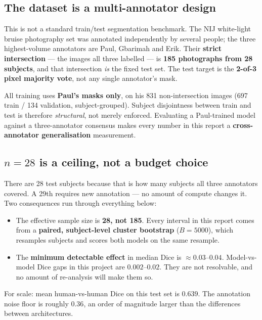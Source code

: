 \documentclass[11pt]{article}
\begin{document}
\subsection{The dataset is a multi-annotator design}

This is not a standard train/test segmentation benchmark. The NIJ white-light bruise photography
set was annotated independently by several people; the three highest-volume annotators are Paul,
Gbarimah and Erik. Their \textbf{strict intersection} --- the images all three labelled --- is
\textbf{185 photographs from 28 subjects}, and that intersection \emph{is} the fixed test set. The
test target is the \textbf{2-of-3 pixel majority vote}, not any single annotator's mask.

All training uses \textbf{Paul's masks only}, on his 831 non-intersection images (697 train / 134
validation, subject-grouped). Subject disjointness between train and test is therefore
\emph{structural}, not merely enforced. Evaluating a Paul-trained model against a three-annotator
consensus makes every number in this report a \textbf{cross-annotator generalisation} measurement.

\subsection{$n=28$ is a ceiling, not a budget choice}

There are 28 test subjects because that is how many subjects all three annotators covered. A 29th
requires new annotation --- no amount of compute changes it. Two consequences run through
everything below:

\begin{itemize}[leftmargin=1.5em,itemsep=2pt]
  \item The effective sample size is \textbf{28, not 185}. Every interval in this report comes
        from a \textbf{paired, subject-level cluster bootstrap} ($B=5000$), which resamples
        subjects and scores both models on the same resample.
  \item The \textbf{minimum detectable effect} in median Dice is $\approx 0.03$--$0.04$.
        Model-vs-model Dice gaps in this project are $0.002$--$0.02$. They are not resolvable,
        and no amount of re-analysis will make them so.
\end{itemize}

For scale: mean human-vs-human Dice on this test set is $0.639$. The annotation noise floor is
roughly $0.36$, an order of magnitude larger than the differences between architectures.
\end{document}
